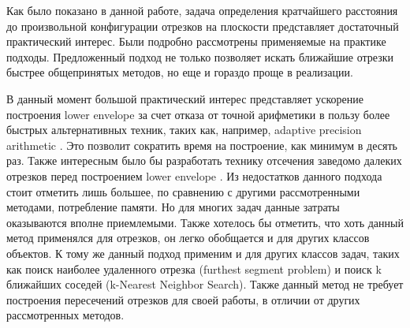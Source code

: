\startconclusionpage

Как было показано в данной работе, задача определения кратчайшего
расстояния до произвольной конфигурации отрезков на плоскости представляет
достаточный практический интерес. Были подробно рассмотрены применяемые
на практике подходы. Предложенный подход не только позволяет искать
ближайшие отрезки быстрее общепринятых методов, но еще и гораздо проще в
реализации.

В данный момент большой практический интерес представляет ускорение
построения lower envelope за счет отказа от точной арифметики в пользу более
быстрых альтернативных техник, таких как, например, adaptive precision
arithmetic \cite{APREC}. Это позволит сократить время на построение, как минимум в
десять раз. Также интересным было бы разработать технику отсечения
заведомо далеких отрезков перед построением lower envelope .
Из недостатков данного подхода стоит отметить лишь большее, по
сравнению с другими рассмотренными методами, потребление памяти. Но для
многих задач данные затраты оказываются вполне приемлемыми.
Также хотелось бы отметить, что хоть данный метод применялся для
отрезков, он легко обобщается и для других классов объектов. К тому же
данный подход применим и для других классов задач, таких как поиск наиболее
удаленного отрезка (furthest segment problem) и поиск k ближайших соседей
(k-Nearest Neighbor Search). Также данный метод не требует построения
пересечений отрезков для своей работы, в отличии от других рассмотренных
методов.
